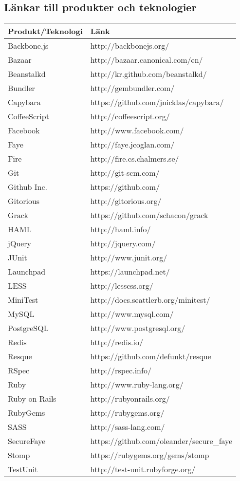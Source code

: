 \subsection{Länkar till produkter och teknologier}
\small
\begin{tabular} { | l | l | }
\hline
\bf{Produkt/Teknologi} & \bf{Länk} \\
\hline
Backbone.js & http://backbonejs.org/ \\
\hline
Bazaar & http://bazaar.canonical.com/en/ \\
\hline
Beanstalkd & http://kr.github.com/beanstalkd/ \\
\hline
Bundler & http://gembundler.com/ \\
\hline
Capybara & https://github.com/jnicklas/capybara/ \\
\hline 
CoffeeScript & http://coffeescript.org/ \\
\hline
Facebook & http://www.facebook.com/ \\
\hline
Faye & http://faye.jcoglan.com/ \\
\hline
Fire & http://fire.cs.chalmers.se/ \\
\hline
Git & http://git-scm.com/ \\
\hline
Github Inc. & https://github.com/ \\
\hline
Gitorious & http://gitorious.org/ \\
\hline
Grack & https://github.com/schacon/grack \\
\hline
HAML & http://haml.info/ \\
\hline
jQuery & http://jquery.com/ \\
\hline
JUnit & http://www.junit.org/ \\
\hline
Launchpad & https://launchpad.net/ \\
\hline
LESS & http://lesscss.org/ \\
\hline
MiniTest & http://docs.seattlerb.org/minitest/ \\
\hline
MySQL & http://www.mysql.com/ \\
\hline
PostgreSQL & http://www.postgresql.org/ \\
\hline
Redis & http://redis.io/ \\
\hline
Resque & https://github.com/defunkt/resque \\
\hline
RSpec & http://rspec.info/ \\
\hline
Ruby & http://www.ruby-lang.org/ \\
\hline
Ruby on Rails & http://rubyonrails.org/ \\
\hline
RubyGems & http://rubygems.org/ \\
\hline
SASS & http://sass-lang.com/ \\
\hline
SecureFaye & https://github.com/oleander/secure\_faye \\
\hline
Stomp & https://rubygems.org/gems/stomp \\
\hline
TestUnit & http://test-unit.rubyforge.org/ \\
\hline
\end{tabular}
\normalsize
